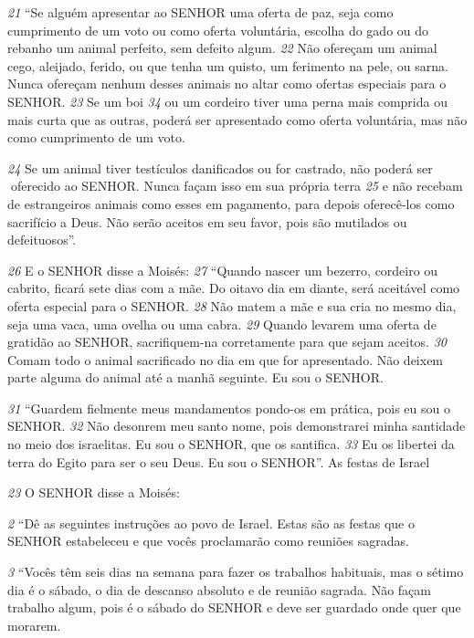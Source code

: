 \textit{\tiny 21}
“Se alguém apresentar ao SENHOR uma oferta de paz, seja como cumprimento
de um voto ou como oferta voluntária, escolha do gado ou do rebanho um animal
perfeito, sem defeito algum. 
\textit{\tiny 22}
Não ofereçam um animal cego, aleijado, ferido, ou
que tenha um quisto, um ferimento na pele, ou sarna. Nunca ofereçam nenhum
desses animais no altar como ofertas especiais para o SENHOR. 
\textit{\tiny 23}
Se um boi
\textit{\tiny 34}
 ou
um cordeiro tiver uma perna mais comprida ou mais curta que as outras, poderá
ser apresentado como oferta voluntária, mas não como cumprimento de um voto.

\textit{\tiny 24}
Se um animal tiver testículos danificados ou for castrado, não poderá ser
oferecido ao SENHOR. Nunca façam isso em sua própria terra 
\textit{\tiny 25}
e não recebam de
estrangeiros animais como esses em pagamento, para depois oferecê-los como
sacrifício a Deus. Não serão aceitos em seu favor, pois são mutilados ou
defeituosos”.
   
\textit{\tiny 26}
E o SENHOR disse a Moisés: 
\textit{\tiny 27}
“Quando nascer um bezerro, cordeiro ou
cabrito, ficará sete dias com a mãe. Do oitavo dia em diante, será aceitável como
oferta especial para o SENHOR. 
\textit{\tiny 28}
Não matem a mãe e sua cria no mesmo dia, seja
uma vaca, uma ovelha ou uma cabra. 
\textit{\tiny 29}
Quando levarem uma oferta de gratidão ao
SENHOR, sacrifiquem-na corretamente para que sejam aceitos. 
\textit{\tiny 30}
Comam todo o
animal sacrificado no dia em que for apresentado. Não deixem parte alguma do
animal até a manhã seguinte. Eu sou o SENHOR.
   
\textit{\tiny 31}
“Guardem fielmente meus mandamentos pondo-os em prática, pois eu sou o
SENHOR. 
\textit{\tiny 32}
Não desonrem meu santo nome, pois demonstrarei minha santidade no
meio dos israelitas. Eu sou o SENHOR, que os santifica. 
\textit{\tiny 33}
Eu os libertei da terra do
Egito para ser o seu Deus. Eu sou o SENHOR”.
As festas de Israel
   
\textit{\tiny 23}
 O SENHOR disse a Moisés:
 
\textit{\tiny 2} “Dê as seguintes instruções ao povo de Israel.
Estas são as festas que o SENHOR estabeleceu e que vocês proclamarão como
reuniões sagradas.
   
\textit{\tiny 3} “Vocês têm seis dias na semana para fazer os trabalhos habituais, mas o
sétimo dia é o sábado, o dia de descanso absoluto e de reunião sagrada. Não
façam trabalho algum, pois é o sábado do SENHOR e deve ser guardado onde quer
que morarem.
   

